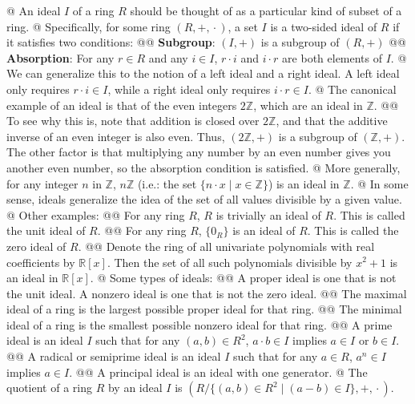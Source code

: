 \documentclass[]{article}
\newcommand{\mbb}[1]{\ensuremath{\mathbb{#1}}}     %
\newcommand{\define}[1]{\textsf{#1}}
\begin{document}
\begin{easylist}[enumerate]
@ {%
  An \define{ideal} $I$ of a ring $R$ should be thought of as a particular kind
  of subset of a ring.
}
@ {%
  Specifically, for some ring $(R, +, {}\cdot{})$, a set $I$ is a
  \define{two-sided ideal} of $R$ if it satisfies two conditions:
}
@@ \textbf{Subgroup}: $(I, +)$ is a subgroup of $(R, +)$
@@ {%
  \textbf{Absorption}: For any $r \in R$ and any $i \in I$, $r \cdot i$ and
  $i \cdot r$ are both elements of $I$.
}
@ {%
  We can generalize this to the notion of a \define{left ideal} and a
  \define{right ideal}. A left ideal only requires $r \cdot i \in I$, while a
  right ideal only requires $i \cdot r \in I$.
}
@ {%
  The canonical example of an ideal is that of the even integers $2\mbb{Z}$,
  which are an ideal in $\mbb{Z}$.
}
@@ {%
  To see why this is, note that addition is closed over $2\mbb{Z}$, and that
  the additive inverse of an even integer is also even. Thus, $(2\mbb{Z}, +)$
  is a subgroup of $(\mbb{Z}, +)$. The other factor is that multiplying any
  number by an even number gives you another even number, so the absorption
  condition is satisfied.
}
@ {%
  More generally, for any integer $n$ in $\mbb{Z}$, $n\mbb{Z}$ (i.e.: the set
  $\{n \cdot x \mid x \in \mbb{Z}\}$) is an ideal in $\mbb{Z}$.
}
@ {%
  In some sense, ideals generalize the idea of the set of all values
  divisible by a given value.
}
@ Other examples:
@@ {%
  For any ring $R$, $R$ is trivially an ideal of $R$.
  This is called the \define{unit ideal} of $R$.
}
@@ {%
  For any ring $R$, $\{0_R\}$ is an ideal of $R$.
  This is called the \define{zero ideal} of $R$.
}
@@ {%
  Denote the ring of all univariate polynomials with real coefficients
  by $\mbb{R}[x]$. Then the set of all such polynomials divisible by $x^2 + 1$
  is an ideal in $\mbb{R}[x]$.
}
@ Some types of ideals:
@@ {%
  A \define{proper ideal}  is one that is not the unit ideal.
  A \define{nonzero ideal} is one that is not the zero ideal.
}
@@ {%
  The \define{maximal ideal} of a ring is the largest possible proper ideal
  for that ring.
}
@@ {%
  The \define{minimal ideal} of a ring is the smallest possible nonzero ideal
  for that ring.
}
@@ {%
  A \define{prime ideal} is an ideal $I$ such that for any $(a, b) \in R^2$,
  $a \cdot b \in I$ implies $a \in I$ or $b \in I$.
}
@@ {%
  A \define{radical} or \define{semiprime ideal} is an ideal $I$ such that
  for any $a \in R$, $a^n \in I$ implies $a \in I$.
}
@@ A \define{principal ideal} is an ideal with one generator.
@ {%
  The \define{quotient of a ring $R$ by an ideal $I$} is
  $(R / \{(a, b) \in R^2 \mid (a - b) \in I\}, +, {}\cdot{})$.
}
\end{easylist}
\end{document}
